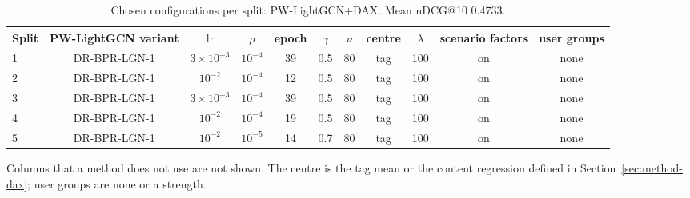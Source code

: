 \begin{table}[tbp]
\centering
\footnotesize
\caption{Chosen configurations per split: PW-LightGCN+DAX. Mean nDCG@10 0.4733.}
\label{tab:grid03}
\begin{adjustbox}{max width=\linewidth}
\begin{tabular}{lcccccccccc}
\toprule
Split & PW-LightGCN variant & $\mathrm{lr}$ & $\rho$ & epoch & $\gamma$ & $\nu$ & centre & $\lambda$ & scenario factors & user groups \\
\midrule
1 & DR-BPR-LGN-1 & $3\times10^{-3}$ & $10^{-4}$ & 39 & 0.5 & 80 & tag & 100 & on & none \\
2 & DR-BPR-LGN-1 & $10^{-2}$ & $10^{-4}$ & 12 & 0.5 & 80 & tag & 100 & on & none \\
3 & DR-BPR-LGN-1 & $3\times10^{-3}$ & $10^{-4}$ & 39 & 0.5 & 80 & tag & 100 & on & none \\
4 & DR-BPR-LGN-1 & $10^{-2}$ & $10^{-4}$ & 19 & 0.5 & 80 & tag & 100 & on & none \\
5 & DR-BPR-LGN-1 & $10^{-2}$ & $10^{-5}$ & 14 & 0.7 & 80 & tag & 100 & on & none \\
\bottomrule
\end{tabular}
\end{adjustbox}
\par\smallskip
\begin{minipage}{\linewidth}\raggedright\footnotesize Columns that a method does not use are not shown. The centre is the tag mean or the content regression defined in Section~\ref{sec:method-dax}; user groups are none or a strength.\end{minipage}
\end{table}
